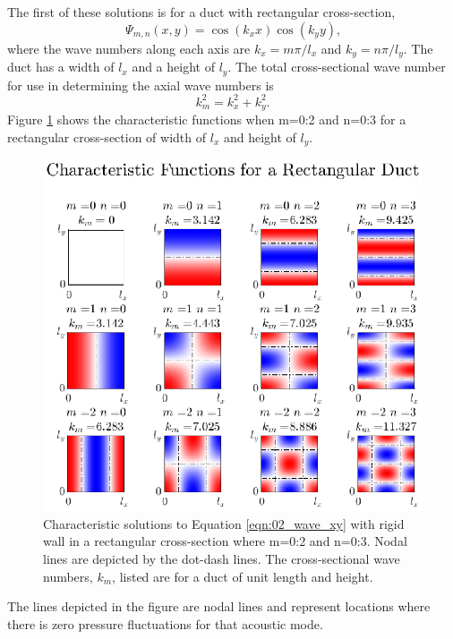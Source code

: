 The first of these solutions is for a duct with rectangular cross-section,
\begin{equation}
  \Psi_{m,n}(x,y) = \cos(k_xx)\cos(k_yy) \textrm{,}
  \label{eqn:02_psi_rect}
\end{equation}
where the wave numbers along each axis are $k_x = m\pi/l_x$ and $k_y = n\pi/l_y$.
The duct has a width of $l_x$ and a height of $l_y$.
The total cross-sectional wave number for use in determining the axial wave numbers is
\begin{equation}
  k_m^2 = k_x^2+k_y^2 \textrm{.}
  \label{eqn:02_wave_number_crosssection}
\end{equation}
Figure \ref{fig:02_cross_section_rect} shows the characteristic functions when m=0:2 and n=0:3 for a rectangular cross-section of width of $l_x$ and height of $l_y$.
\begin{figure}
  \centering
  \includegraphics{../matlab/02_background/cross_section_rect.eps}
  \caption{Characteristic solutions to Equation \ref{eqn:02_wave_xy} with rigid wall in a rectangular cross-section where m=0:2 and n=0:3.  Nodal lines are depicted by the dot-dash lines.  The cross-sectional wave numbers, $k_m$, listed are for a duct of unit length and height.}
  \label{fig:02_cross_section_rect}
\end{figure}
The lines depicted in the figure are nodal lines and represent locations where there is zero pressure fluctuations for that acoustic mode.

